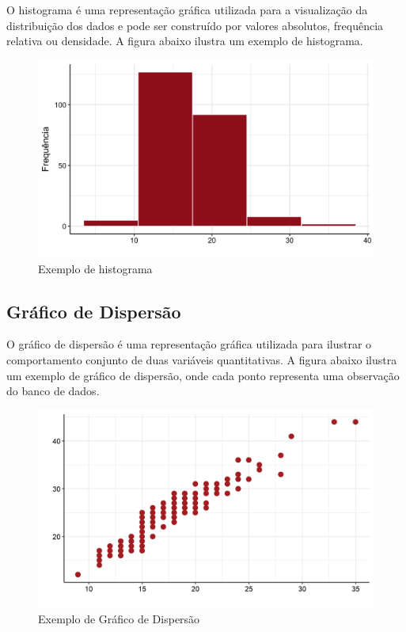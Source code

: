 \documentclass[
]{estat/estat}
\begin{document}
O histograma é uma representação gráfica utilizada para a visualização
da distribuição dos dados e pode ser construído por valores absolutos,
frequência relativa ou densidade. A figura abaixo ilustra um exemplo de
histograma.

\begin{figure}[H]

\caption{Exemplo de histograma}

{\centering \includegraphics{images/hist_uni.png}

}

\end{figure}%

\subsection{Gráfico de Dispersão}\label{gruxe1fico-de-dispersuxe3o}

O gráfico de dispersão é uma representação gráfica utilizada para
ilustrar o comportamento conjunto de duas variáveis quantitativas. A
figura abaixo ilustra um exemplo de gráfico de dispersão, onde cada
ponto representa uma observação do banco de dados.

\begin{figure}[H]

\caption{Exemplo de Gráfico de Dispersão}

{\centering \includegraphics{images/disp_uni.png}

}

\end{figure}%
\end{document}
